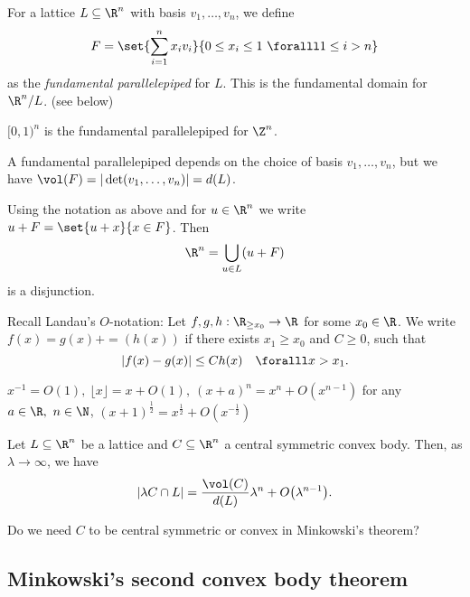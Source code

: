 \begin{notat*}
	For a lattice \( L \subseteq \R^n \) with basis \( v_1, \dotsc, v_n \), we define
	\[ F = \set{\sum_{i=1}^{n} x_i v_i}{0 \leq x_i \leq 1 \ \foralll 1 \leq i > n} \]
	as the \emph{fundamental parallelepiped} for \( L \).
	This is the fundamental domain for \( \R^n/L \). (see below)
\end{notat*}

\begin{exmp*}
	\( [0,1)^n \) is the fundamental parallelepiped for \( \Z^n \).
\end{exmp*}

\begin{rem*}
	A fundamental parallelepiped depends on the choice of basis \( v_1, \dotsc, v_n \), but we have \( \vol(F) = |\det(v_1, \dotsc, v_n)| = d(L) \).
\end{rem*}

\begin{lem}
	Using the notation as above and for \( u \in \R^n \) we write \( u + F = \set{u+x}{x \in F} \).
	Then
	\[ \R^n = \bigcup_{u \in L} (u+F) \]
	is a disjunction.
\end{lem}

\begin{rem*}
	Recall Landau's \( O \)-notation: Let \( f, g, h: \R_{\geq x_0} \to \R \) for some \( x_0 \in \R \).
	We write \( f(x) = g(x) + =(h(x)) \) if there exists \( x_1 \geq x_0 \) and \( C \geq 0 \), such that
	\[ |f(x) - g(x)| \leq C h(x) \quad \foralll x > x_1. \]
\end{rem*}

\begin{exmp*}
	\( x^{-1} = O(1),\ \lfloor x \rfloor = x + O(1),\ (x+a)^n = x^n + O(x^{n-1}) \) for any \( a \in \R,\ n \in \N \), \( (x+1)^\frac{1}{2} = x^\frac{1}{2} + O(x^{-\frac{1}{2}}) \)
\end{exmp*}

\begin{lem}
	Let \( L \subseteq \R^n \) be a lattice and \( C \subseteq \R^n \) a central symmetric convex body.
	Then, as \( \lambda \to \infty \), we have
	\[ |\lambda C \cap L| = \frac{\vol(C)}{d(L)} \lambda^n + O \big(\lambda^{n-1} \big). \]
\end{lem}

\begin{frage*}
	Do we need \( C \) to be central symmetric or convex in Minkowski's theorem?
\end{frage*}

\subsection*{Minkowski's second convex body theorem}

